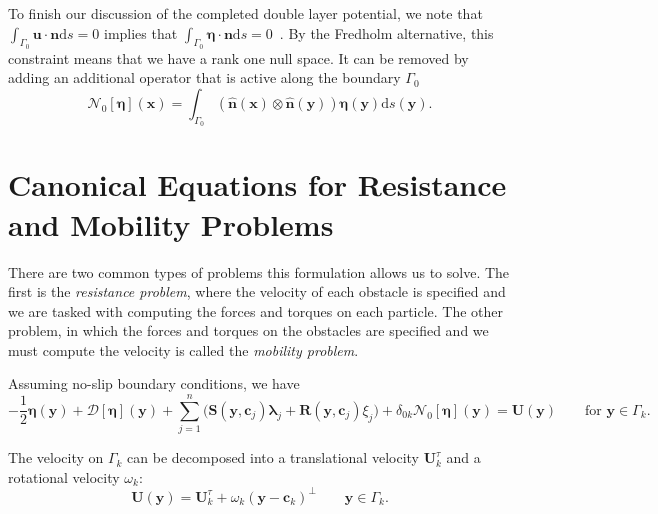 To finish our discussion of the completed double layer potential, we note that  $\int_{\Gamma_0} \mathbf{u}\cdot\mathbf{n}\text{d}s = 0$ implies that $\int_{\Gamma_0 }\pmb{\eta}\cdot\mathbf{n}\text{d}s = 0$~\cite{Pozrikidis1992}. By the Fredholm alternative, this constraint means that we have a rank one null space. It can be removed by adding an additional operator that is active along the boundary $\Gamma_0$
\begin{equation}
	\mathcal{N}_0[\pmb{\eta}](\mathbf{x}) = \int_{\Gamma_0}(\hat{\mathbf{n}}(\mathbf{x})\otimes\hat{\mathbf{n}}(\mathbf{y}))\pmb{\eta}(\mathbf{y})\text{d}s(\mathbf{y}).
\end{equation}

\section{Canonical Equations for Resistance and Mobility Problems}

There are two common types of problems this formulation allows us to solve. The first is the \textit{resistance problem}, where the velocity of each obstacle is specified  and we are tasked with computing the forces and torques on each particle. The other problem, in which the forces and torques on the obstacles are specified and we must compute the velocity is called the \textit{mobility problem}. 

Assuming no-slip boundary conditions, we have
\begin{equation}\label{eq:canonical1}
-\frac{1}{2}\pmb{\eta}(\mathbf{y}) + \mathcal{D}[\pmb{\eta}](\mathbf{y}) + \sum\limits_{j=1}^n \biggr(\mathbf{S}(\mathbf{y},\mathbf{c}_j)\pmb{\lambda}_j + \mathbf{R}(\mathbf{y},\mathbf{c}_j)\xi_j\biggr) + \delta_{0k}\mathcal{N}_0[\pmb{\eta}](\mathbf{y}) = \mathbf{U}(\mathbf{y}) \qquad \text{for } \mathbf{y}\in\Gamma_k.
\end{equation}

The velocity on $\Gamma_k$ can be decomposed into a translational velocity $\mathbf{U}^\tau_k$ and a rotational velocity $\omega_k$:
\[ \mathbf{U}(\mathbf{y}) = \mathbf{U}^\tau_k + \omega_k(\mathbf{y} - \mathbf{c}_k)^\perp \qquad \mathbf{y}\in\Gamma_k.\]

